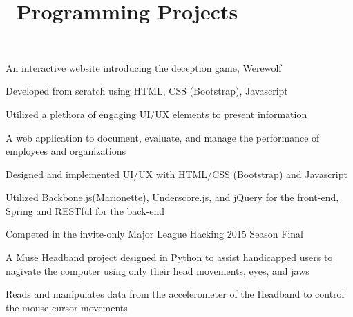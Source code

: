 \documentclass[]{ez-resume-config}
\begin{document}
\hfill
\begin{minipage}[t]{0.66\textwidth} 


\section{\faGlobe \ Programming Projects}
 \\
\vspace{\topsep} %
\begin{tightemize}
    \item An interactive website introducing the deception game, Werewolf
    \item Developed from scratch using HTML, CSS (Bootstrap), Javascript
    \item Utilized a plethora of engaging UI/UX elements to present information
\end{tightemize}
\sectionsep

\begin{tightemize}
    \item A web application to document, evaluate, and manage the performance of employees and organizations
    \item Designed and implemented UI/UX with HTML/CSS (Bootstrap) and Javascript
    \item Utilized Backbone.js(Marionette), Underscore.js, and jQuery for the front-end, Spring and RESTful for the back-end
\end{tightemize}
\sectionsep

\begin{tightemize}
    \item Competed in the invite-only Major League Hacking 2015 Season Final
    \item A Muse\texttrademark {} Headband project designed in Python to assist handicapped users to nagivate the computer using only their head movements, eyes, and jaws
    \item Reads and manipulates data from the accelerometer of the Headband to control the mouse cursor movements
\end{tightemize}
\sectionsep


\end{minipage}
\end{document}
